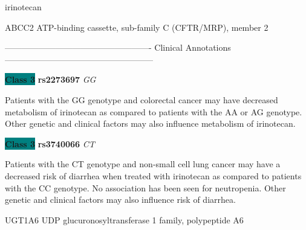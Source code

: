 \documentclass{resume} %
\begin{document}
\begin{rSection}{ irinotecan }
\begin{rSubsection}{ ABCC2 }{ ATP-binding cassette, sub-family C (CFTR/MRP), member 2 }{}{}
\item[] ---------------------------------------------------- Clinical Annotations -----------------------------------------------------\newline
\item \textbf{\colorbox{teal} {Class 3}} \textbf{ rs2273697 } \textit{ GG }
\item[] Patients with the GG genotype and colorectal cancer may have decreased metabolism of irinotecan as compared to patients with the AA or AG genotype. Other genetic and clinical factors may also influence metabolism of irinotecan.\item \textbf{\colorbox{teal} {Class 3}} \textbf{ rs3740066 } \textit{ CT }
\item[] Patients with the CT genotype and non-small cell lung cancer may have a decreased risk of diarrhea when treated with irinotecan as compared to patients with the CC genotype. No association has been seen for neutropenia. Other genetic and clinical factors may also influence risk of diarrhea.
\end{rSubsection}\begin{rSubsection}{ UGT1A6 }{ UDP glucuronosyltransferase 1 family, polypeptide A6 }{}{}
\item[]


\end{rSubsection}
\end{rSection}
\end{document}
